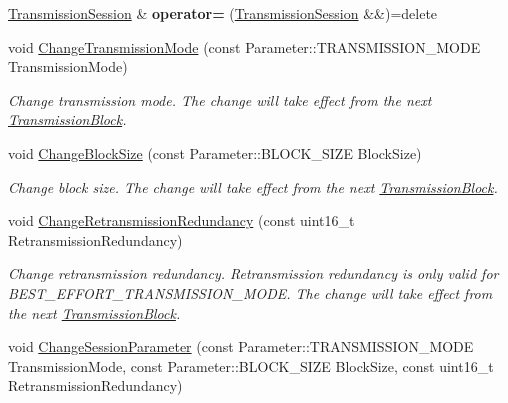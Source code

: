 \begin{DoxyCompactItemize}
\item 
\hyperlink{class_network_coding_1_1_transmission_session}{Transmission\+Session} \& {\bfseries operator=} (\hyperlink{class_network_coding_1_1_transmission_session}{Transmission\+Session} \&\&)=delete\hypertarget{class_network_coding_1_1_transmission_session_a51b0867e33647c0f0556992d4a099829}{}\label{class_network_coding_1_1_transmission_session_a51b0867e33647c0f0556992d4a099829}

\item 
void \hyperlink{class_network_coding_1_1_transmission_session_a99838e572cbc7b5876d59d767e399a4e}{Change\+Transmission\+Mode} (const Parameter\+::\+T\+R\+A\+N\+S\+M\+I\+S\+S\+I\+O\+N\+\_\+\+M\+O\+DE Transmission\+Mode)
\begin{DoxyCompactList}\small\item\em Change transmission mode. The change will take effect from the next \hyperlink{class_network_coding_1_1_transmission_block}{Transmission\+Block}. \end{DoxyCompactList}\item 
void \hyperlink{class_network_coding_1_1_transmission_session_aaeb60cbe08b7ba62291dbfff17ed987d}{Change\+Block\+Size} (const Parameter\+::\+B\+L\+O\+C\+K\+\_\+\+S\+I\+ZE Block\+Size)
\begin{DoxyCompactList}\small\item\em Change block size. The change will take effect from the next \hyperlink{class_network_coding_1_1_transmission_block}{Transmission\+Block}. \end{DoxyCompactList}\item 
void \hyperlink{class_network_coding_1_1_transmission_session_ae3d21866fedfd756de3d7ab6d2151ec4}{Change\+Retransmission\+Redundancy} (const uint16\+\_\+t Retransmission\+Redundancy)
\begin{DoxyCompactList}\small\item\em Change retransmission redundancy. Retransmission redundancy is only valid for B\+E\+S\+T\+\_\+\+E\+F\+F\+O\+R\+T\+\_\+\+T\+R\+A\+N\+S\+M\+I\+S\+S\+I\+O\+N\+\_\+\+M\+O\+DE. The change will take effect from the next \hyperlink{class_network_coding_1_1_transmission_block}{Transmission\+Block}. \end{DoxyCompactList}\item 
void \hyperlink{class_network_coding_1_1_transmission_session_a4a2f5696da8bd656d1b250d2319f1212}{Change\+Session\+Parameter} (const Parameter\+::\+T\+R\+A\+N\+S\+M\+I\+S\+S\+I\+O\+N\+\_\+\+M\+O\+DE Transmission\+Mode, const Parameter\+::\+B\+L\+O\+C\+K\+\_\+\+S\+I\+ZE Block\+Size, const uint16\+\_\+t Retransmission\+Redundancy)

\end{DoxyCompactItemize}
